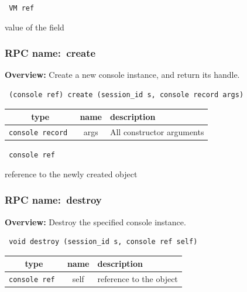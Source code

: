 \vspace{0.3cm}

{\tt 
VM ref
}


value of the field
\vspace{0.3cm}
\vspace{0.3cm}
\vspace{0.3cm}
\subsubsection{RPC name:~create}

{\bf Overview:} 
Create a new console instance, and return its handle.

\begin{verbatim} (console ref) create (session_id s, console record args)\end{verbatim}



 
\vspace{0.3cm}
\begin{tabular}{|c|c|p{7cm}|}
 \hline
{\bf type} & {\bf name} & {\bf description} \\ \hline
{\tt console record } & args & All constructor arguments \\ \hline 

\end{tabular}

\vspace{0.3cm}

{\tt 
console ref
}


reference to the newly created object
\vspace{0.3cm}
\vspace{0.3cm}
\vspace{0.3cm}
\subsubsection{RPC name:~destroy}

{\bf Overview:} 
Destroy the specified console instance.

\begin{verbatim} void destroy (session_id s, console ref self)\end{verbatim}



 
\vspace{0.3cm}
\begin{tabular}{|c|c|p{7cm}|}
 \hline
{\bf type} & {\bf name} & {\bf description} \\ \hline
{\tt console ref } & self & reference to the object \\ \hline 

\end{tabular}

